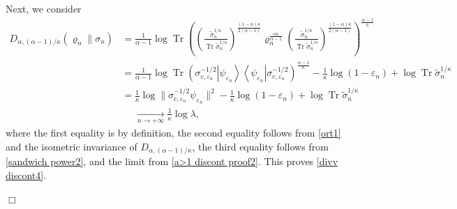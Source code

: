 \documentclass[unsortedaddress,superscriptaddress,pra,notitlepage]{revtex4}
\newenvironment{proof}[1][Proof]{\begin{trivlist}
\item[\hskip \labelsep {\bfseries #1}]}{\hfill$\Box$\end{trivlist}}
\def\ep{\varepsilon}
\def\rho{\varrho}
\def\bz{\left(}
\def\jz{\right)}
\def\pwr{\kappa}
\newcommand{\ds}{\mbox{ }\mbox{ }}
\newcommand{\snorm}[1]{\| #1\|}
\newcommand{\diad}[2]{\left|#1\right\rangle\!\left\langle #2\right|}
\newcommand{\pr}[1]{\diad{#1}{#1}}
\DeclareMathOperator{\Tr}{Tr}
\begin{document}
\begin{proof}
Next, we consider
\begin{align*}
D_{\alpha,(\alpha-1)/\pwr}(\rho_n\|\sigma_n)
&=
\frac{1}{\alpha-1}\log\Tr\bz
\bz\frac{\tilde\sigma_n^{1/\pwr}}{\Tr\tilde\sigma_n^{1/\pwr}}\jz^{\frac{(1-\alpha)\pwr}{2(\alpha-1)}}
\rho_n^{\frac{\alpha\pwr}{\alpha-1}}
\bz\frac{\tilde\sigma_n^{1/\pwr}}{\Tr\tilde\sigma_n^{1/\pwr}}\jz^{\frac{(1-\alpha)\pwr}{2(\alpha-1)}}
\jz^{\frac{\alpha-1}{\pwr}}\\
&=
\frac{1}{\alpha-1}\log\Tr\bz\sigma_{c,\ep_n}^{-1/2}\pr{\psi_{\ep_n}}\sigma_{c,\ep_n}^{-1/2}\jz^{\frac{\alpha-1}{\pwr}}-\frac{1}{\pwr}\log(1-\ep_n)
+\log\Tr\tilde\sigma_n^{1/\pwr}\\
&=
\frac{1}{\pwr}\log\snorm{\sigma_{c,\ep_n}^{-1/2}\psi_{\ep_n}}^2
-\frac{1}{\pwr}\log(1-\ep_n)+\log\Tr\tilde\sigma_n^{1/\pwr}\\
&\ds\xrightarrow[n\to+\infty]{}\frac{1}{\pwr}\log\lambda,
\end{align*}
where the first equality is by definition, 
the second equality follows from \eqref{ort1} and the isometric invariance of 
$D_{\alpha,(\alpha-1)/\pwr}$, the third equality follows from \eqref{sandwich power2},
and the limit from 
\eqref{a>1 discont proof2}. This proves \eqref{divv discont4}.


\end{proof}
\end{document}
